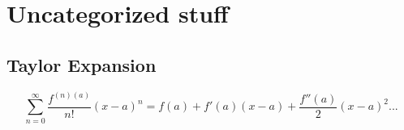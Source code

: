 
\chapter{Uncategorized stuff}
\section{Taylor Expansion}
\begin{equation}
 \sum_{n=0}^{\infty} \frac{f^{(n)(a)}}{n!}(x - a)^n = f(a) + f'(a) (x-a) + \frac{f''(a)}{2}(x-a)^2 ...
\end{equation}

